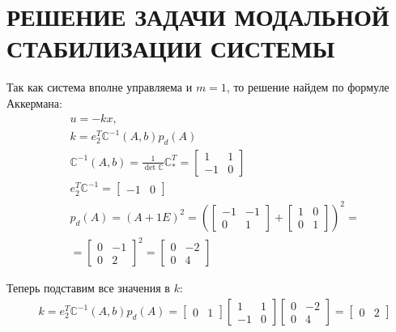\chapter{\MakeUppercase{Решение задачи модальной стабилизации системы}}

Так как система вполне управляема и $ m = 1 $, то решение найдем по формуле Аккермана:
\begin{align*}
    &u=-kx, \; \\ &k=e^T_2 \mathbb{C}^{-1}(A,b)p_d(A) \\
    &\mathbb{C}^{-1}(A,b) = \frac1{\det\mathbb{C}} \mathbb{C}^T_* = \begin{bmatrix}
        1 & 1 \\ -1 & 0
    \end{bmatrix} \\
    &e^T_2 \mathbb{C}^{-1} = \begin{bmatrix}
        -1 & 0
    \end{bmatrix} \\
    &p_d(A) = (A + 1 E)^2 = \left(\begin{bmatrix}
        -1 & -1 \\ 0 & 1
    \end{bmatrix} + \begin{bmatrix}
        1 & 0 \\ 0 & 1
    \end{bmatrix}\right)^2 = \\
    &= \begin{bmatrix}
        0 & -1 \\ 0 & 2
    \end{bmatrix} ^2 = \begin{bmatrix}
        0 & -2 \\ 0 & 4
    \end{bmatrix}
\end{align*}

\noindent Теперь подставим все значения в $ k $:
\begin{align*}
    &k=e^T_2 \mathbb{C}^{-1}(A,b)p_d(A) = 
    \begin{bmatrix}
        0 & 1
    \end{bmatrix} \begin{bmatrix}
        1 & 1 \\ -1 & 0
    \end{bmatrix} \begin{bmatrix}
        0 & -2 \\ 0 & 4
    \end{bmatrix} = \begin{bmatrix}
        0 & 2
    \end{bmatrix}
\end{align*}

